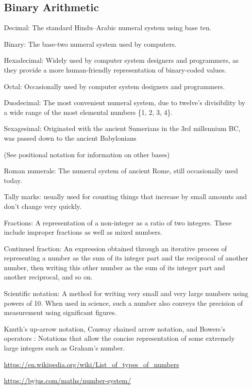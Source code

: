 \documentclass[]{book}
\begin{document}
\hypertarget{binary-arithmetic}{%
\subsection{Binary Arithmetic}\label{binary-arithmetic}}

Decimal: The standard Hindu--Arabic numeral system using base ten.

Binary: The base-two numeral system used by computers.

Hexadecimal: Widely used by computer system designers and programmers, as they provide a more human-friendly representation of binary-coded values.

Octal: Occasionally used by computer system designers and programmers.

Duodecimal: The most convenient numeral system, due to twelve's divisibility by a wide range of the most elemental numbers \{1, 2, 3, 4\}.

Sexagesimal: Originated with the ancient Sumerians in the 3rd millennium BC, was passed down to the ancient Babylonians

(See positional notation for information on other bases)

Roman numerals: The numeral system of ancient Rome, still occasionally used today.

Tally marks: usually used for counting things that increase by small amounts and don't change very quickly.

Fractions: A representation of a non-integer as a ratio of two integers. These include improper fractions as well as mixed numbers.

Continued fraction: An expression obtained through an iterative process of representing a number as the sum of its integer part and the reciprocal of another number, then writing this other number as the sum of its integer part and another reciprocal, and so on.

Scientific notation: A method for writing very small and very large numbers using powers of 10. When used in science, such a number also conveys the precision of measurement using significant figures.

Knuth's up-arrow notation, Conway chained arrow notation, and Bowers's operators : Notations that allow the concise representation of some extremely large integers such as Graham's number.

\url{https://en.wikipedia.org/wiki/List_of_types_of_numbers}

\url{https://byjus.com/maths/number-system/}
\end{document}
